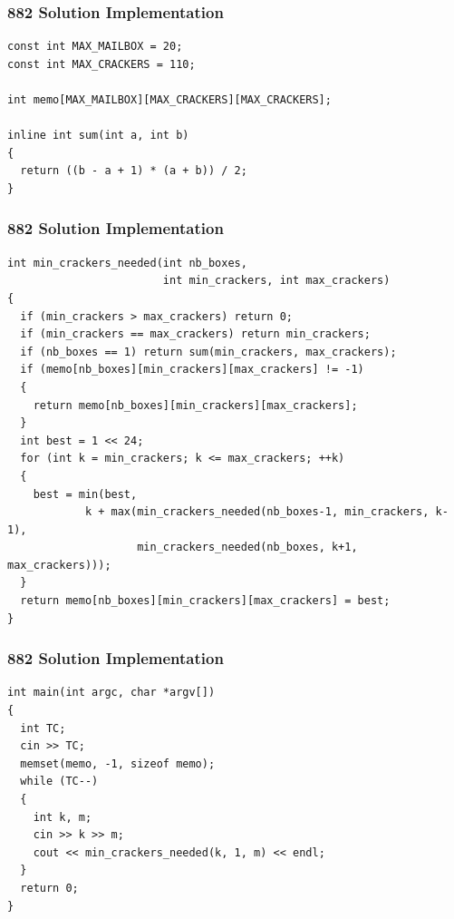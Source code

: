 \documentclass{beamer}
\newcommand{\uvalink}[2]{UVa Online Judge (http://uva.onlinejudge.org)
  problem number \href{#2}{\textcolor{blue}{#1}.}}
\newcounter{exo}
\newcommand{\exo}{
  \addtocounter{exo}{1}
  Exercice \arabic{exo}
}
\begin{document}
\begin{frame}[containsverbatim]
\frametitle{882 Solution Implementation}

\scriptsize
\begin{lstlisting}
const int MAX_MAILBOX = 20;
const int MAX_CRACKERS = 110;

int memo[MAX_MAILBOX][MAX_CRACKERS][MAX_CRACKERS];

inline int sum(int a, int b)
{
  return ((b - a + 1) * (a + b)) / 2;
}
\end{lstlisting}

\end{frame}

\begin{frame}[containsverbatim]
\frametitle{882 Solution Implementation}

\scriptsize
\begin{lstlisting}
int min_crackers_needed(int nb_boxes,
                        int min_crackers, int max_crackers)
{
  if (min_crackers > max_crackers) return 0;
  if (min_crackers == max_crackers) return min_crackers;
  if (nb_boxes == 1) return sum(min_crackers, max_crackers);
  if (memo[nb_boxes][min_crackers][max_crackers] != -1)
  {
    return memo[nb_boxes][min_crackers][max_crackers];
  }
  int best = 1 << 24;
  for (int k = min_crackers; k <= max_crackers; ++k)
  {
    best = min(best,
            k + max(min_crackers_needed(nb_boxes-1, min_crackers, k-1),
                    min_crackers_needed(nb_boxes, k+1, max_crackers)));
  }
  return memo[nb_boxes][min_crackers][max_crackers] = best;
}
\end{lstlisting}

\end{frame}

\begin{frame}[containsverbatim]
\frametitle{882 Solution Implementation}

\scriptsize
\begin{lstlisting}
int main(int argc, char *argv[])
{
  int TC;
  cin >> TC;
  memset(memo, -1, sizeof memo);
  while (TC--)
  {
    int k, m;
    cin >> k >> m;
    cout << min_crackers_needed(k, 1, m) << endl;
  }
  return 0;
}
\end{lstlisting}

\end{frame}

\fi

\end{document}
